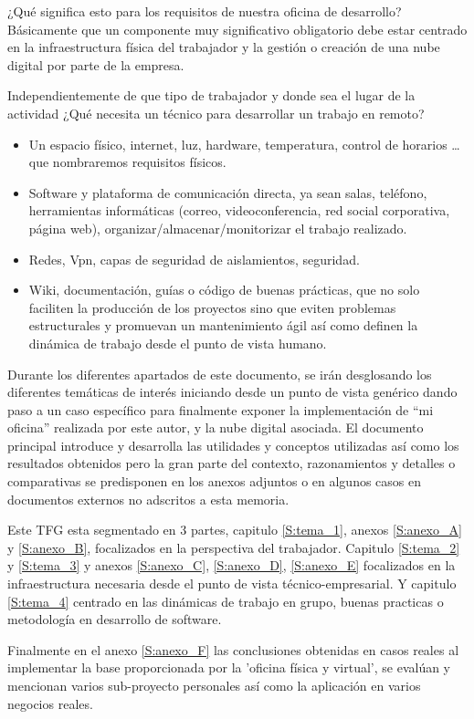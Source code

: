 ¿Qué significa esto para los requisitos de nuestra oficina de desarrollo? Básicamente que un componente muy significativo obligatorio debe estar centrado en la infraestructura física del trabajador y la gestión o creación de una nube digital por parte de la empresa. 

Independientemente de que tipo de trabajador y donde sea el lugar de la actividad ¿Qué necesita un técnico para desarrollar un trabajo en remoto?

\begin{itemize}
    \item Un espacio físico, internet, luz, hardware, temperatura, control de horarios … que nombraremos requisitos físicos.
    
    \item Software y plataforma de comunicación directa, ya sean salas, teléfono, herramientas informáticas (correo,  videoconferencia, red social corporativa, página web), organizar/almacenar/monitorizar el trabajo realizado.

    \item Redes, Vpn, capas de seguridad de aislamientos, seguridad.
    
    \item Wiki, documentación, guías o código de buenas prácticas, que no solo faciliten la producción de los proyectos sino que eviten problemas estructurales y promuevan un mantenimiento ágil así como definen la dinámica de trabajo desde el punto de vista humano.
    
\end{itemize}

Durante los diferentes apartados de este documento, se irán desglosando los diferentes temáticas de interés iniciando desde un punto de vista genérico dando paso a un caso específico para finalmente exponer la implementación de “mi oficina” realizada por este autor, y la nube digital asociada. El documento principal introduce y desarrolla las utilidades y conceptos utilizadas así como los resultados obtenidos pero la gran parte del contexto, razonamientos y detalles o comparativas se predisponen en los anexos adjuntos o en algunos casos en documentos externos no adscritos a esta memoria.

Este TFG esta segmentado en 3 partes, capitulo \ref{S:tema_1}, anexos \ref{S:anexo_A} y \ref{S:anexo_B}, focalizados en la perspectiva del trabajador. Capitulo \ref{S:tema_2} y \ref{S:tema_3} y anexos \ref{S:anexo_C}, \ref{S:anexo_D}, \ref{S:anexo_E} focalizados en la infraestructura necesaria desde el punto de vista técnico-empresarial. Y capitulo \ref{S:tema_4} centrado en las dinámicas de trabajo en grupo, buenas practicas o metodología en desarrollo de software.

Finalmente en el anexo \ref{S:anexo_F} las conclusiones obtenidas en casos reales al implementar la base proporcionada por la 'oficina física y virtual', se evalúan y mencionan varios sub-proyecto personales así como la aplicación en varios negocios reales.

